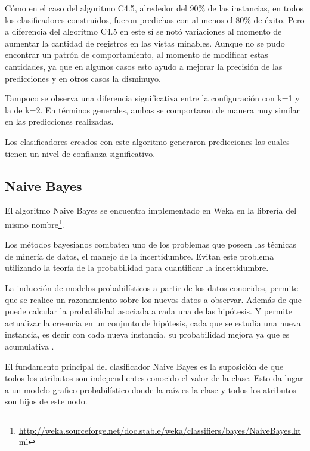 Cómo en el caso del algoritmo C4.5, alrededor del 90\% de las instancias, en todos los clasificadores construidos, fueron predichas con al menos el 80\% de éxito. Pero a diferencia del algoritmo C4.5 en este sí se notó variaciones al momento de aumentar la cantidad de registros en las vistas minables. Aunque no se pudo encontrar un patrón de comportamiento, al momento de modificar estas cantidades, ya que en algunos casos esto ayudo a mejorar la precisión de las predicciones y en otros casos la disminuyo.

Tampoco se observa una diferencia significativa entre la configuración con k=1 y la de k=2. En términos generales, ambas se comportaron de manera muy similar en las predicciones realizadas.

Los clasificadores creados con este algoritmo generaron predicciones las cuales tienen un nivel de confianza significativo.
\subsection{Naive Bayes}
El algoritmo Naive Bayes se encuentra implementado en Weka en la librería del mismo nombre\footnote{\url{http://weka.sourceforge.net/doc.stable/weka/classifiers/bayes/NaiveBayes.html}}.

Los métodos bayesianos combaten uno de los problemas que poseen las técnicas de minería de datos, el manejo de la incertidumbre. Evitan este problema utilizando la teoría de la probabilidad para cuantificar la incertidumbre.

La inducción de modelos probabilísticos a partir de los datos conocidos, permite que se realice un razonamiento sobre los nuevos datos a observar. Además de que puede calcular la probabilidad asociada a cada una de las hipótesis. Y permite actualizar la creencia en un conjunto de hipótesis, cada que se estudia una nueva instancia, es decir con cada nueva instancia, su probabilidad mejora ya que es acumulativa \cite{key-230}.

El fundamento principal del clasificador Naive Bayes es la suposición de que todos los atributos son independientes conocido el valor de la clase. Esto da lugar a un modelo grafico probabilístico donde la raíz es la clase y todos los atributos son hijos de este nodo. 

